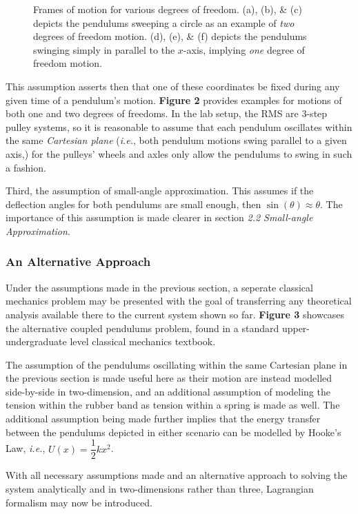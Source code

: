 \documentclass[12pt]{article}
\begin{document}
\begin{multicols}{2}
\begin{figure}[H]
    \caption{
        Frames of motion for various degrees of freedom.
        (a), (b), \& (c) depicts the pendulums sweeping a circle as an
        example of \textit{two} degrees of freedom motion. (d), (e), \& (f)
        depicts the pendulums swinging simply in parallel to the $x$-axis,
        implying \textit{one} degree of freedom motion.
    }
\end{figure}
\noindent
This assumption asserts then that one of these coordinates be fixed during any given time of a pendulum's motion.
\textbf{Figure 2} provides examples for motions of both one and two degrees of freedoms. 
In the lab setup, the RMS are 3-step pulley systems,
so it is reasonable to assume that each pendulum oscillates within the same \textit{Cartesian plane} (\textit{i.e.},
both pendulum motions swing parallel to a given axis,) for the pulleys' wheels and axles only allow the pendulums to swing in such a fashion.

Third, the assumption of small-angle approximation.
This assumes if the deflection angles for both pendulums are small enough, then $\sin(\theta)\approx\theta$.
The importance of this assumption is made clearer in section \textit{2.2 Small-angle Approximation}.

\subsubsection{An Alternative Approach}
Under the assumptions made in the previous section,
a seperate classical mechanics problem may be presented with the goal of transferring any theoretical analysis available there to the current system shown so far.
\textbf{Figure 3} showcases the alternative coupled pendulums problem, found in a standard upper-undergraduate level classical mechanics textbook.

The assumption of the pendulums oscillating within the same Cartesian plane in the previous section is made useful here as their motion are instead modelled side-by-side in two-dimension,
and an additional assumption of modeling the tension within the rubber band as tension within a spring is made as well.
The additional assumption being made further implies that the energy transfer between the pendulums depicted in either scenario can be modelled by Hooke's Law,
\textit{i.e.}, $U(x)=\dfrac{1}{2}kx^2$.

With all necessary assumptions made and an alternative approach to solving the system analytically and in two-dimensions rather than three,
Lagrangian formalism may now be introduced.



\end{multicols}
\end{document}
